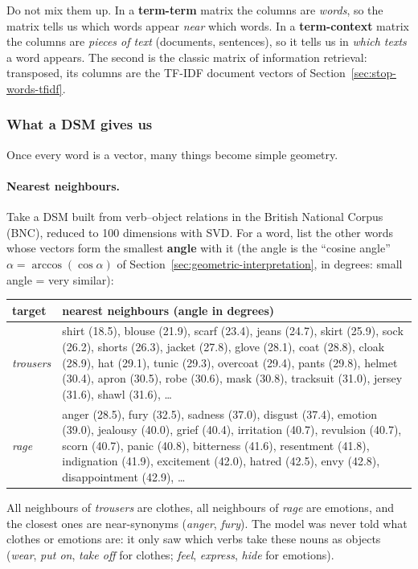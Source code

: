 \begin{nbwarning}
Do not mix them up. In a \textbf{term-term} matrix the columns are \emph{words}, so the
matrix tells us which words appear \emph{near} which words. In a \textbf{term-context}
matrix the columns are \emph{pieces of text} (documents, sentences), so it tells us in
\emph{which texts} a word appears. The second is the classic matrix of information
retrieval: transposed, its columns are the TF-IDF document vectors of
Section~\ref{sec:stop-words-tfidf}.
\end{nbwarning}

\subsubsection{What a DSM gives us}

Once every word is a vector, many things become simple geometry.

\paragraph{Nearest neighbours.}
Take a DSM built from verb--object relations in the British National Corpus (BNC),
reduced to 100 dimensions with SVD. For a word, list the other words whose vectors form
the smallest \textbf{angle} with it (the angle is the ``cosine angle''
$\alpha = \arccos(\cos\alpha)$ of Section~\ref{sec:geometric-interpretation}, in
degrees: small angle = very similar):

\begin{center}
\small
\begin{tabularx}{\linewidth}{@{}l X@{}}
\toprule
\textbf{target} & \textbf{nearest neighbours (angle in degrees)} \\
\midrule
\emph{trousers} & shirt (18.5), blouse (21.9), scarf (23.4), jeans (24.7), skirt (25.9),
  sock (26.2), shorts (26.3), jacket (27.8), glove (28.1), coat (28.8), cloak (28.9),
  hat (29.1), tunic (29.3), overcoat (29.4), pants (29.8), helmet (30.4), apron (30.5),
  robe (30.6), mask (30.8), tracksuit (31.0), jersey (31.6), shawl (31.6), \ldots \\
\emph{rage} & anger (28.5), fury (32.5), sadness (37.0), disgust (37.4), emotion (39.0),
  jealousy (40.0), grief (40.4), irritation (40.7), revulsion (40.7), scorn (40.7),
  panic (40.8), bitterness (41.6), resentment (41.8), indignation (41.9),
  excitement (42.0), hatred (42.5), envy (42.8), disappointment (42.9), \ldots \\
\bottomrule
\end{tabularx}
\end{center}
All neighbours of \emph{trousers} are clothes, all neighbours of \emph{rage} are
emotions, and the closest ones are near-synonyms (\emph{anger}, \emph{fury}). The model
was never told what clothes or emotions are: it only saw which verbs take these nouns as
objects (\emph{wear}, \emph{put on}, \emph{take off} for clothes; \emph{feel},
\emph{express}, \emph{hide} for emotions).

